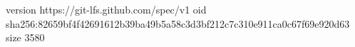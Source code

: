 version https://git-lfs.github.com/spec/v1
oid sha256:82659bf4f42691612b39ba49b5a58c3d3bf212c7c310e911ca0c67f69e920d63
size 3580
